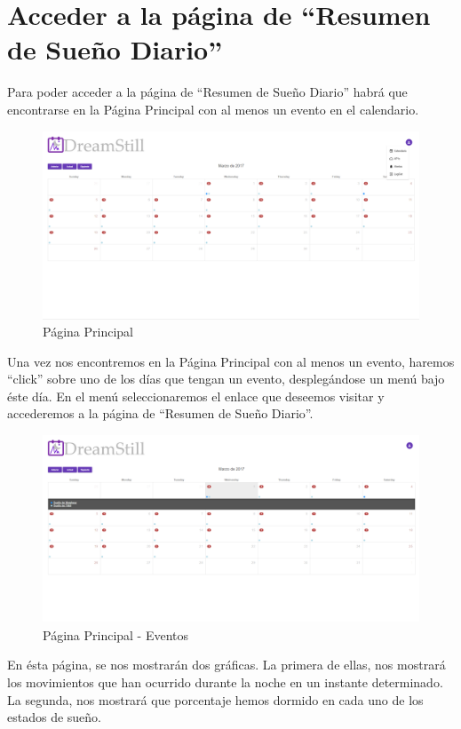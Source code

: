 \documentclass[11pt,openany]{book}
\begin{document}
\section{Acceder a la página de ``Resumen de Sueño Diario''}

Para poder acceder a la página de ``Resumen de Sueño Diario'' habrá que encontrarse en la Página Principal con al menos un evento en el calendario.

\begin{figure}[H]
\centering
\includegraphics[totalheight=7cm]{manualUsuario/paginaPrincipal.png}
\caption{Página Principal}
\end{figure}

Una vez nos encontremos en la Página Principal con al menos un evento, haremos ``click'' sobre uno de los días que tengan un evento, desplegándose un menú bajo éste día. En el menú seleccionaremos el enlace que deseemos visitar y accederemos a la página de ``Resumen de Sueño Diario''.

\begin{figure}[H]
\centering
\includegraphics[totalheight=7cm]{manualUsuario/eventos.png}
\caption{Página Principal - Eventos}
\end{figure}

En ésta página, se nos mostrarán dos gráficas. La primera de ellas, nos mostrará los movimientos que han ocurrido durante la noche en un instante determinado. La segunda, nos mostrará que porcentaje hemos dormido en cada uno de los estados de sueño.
\end{document}
